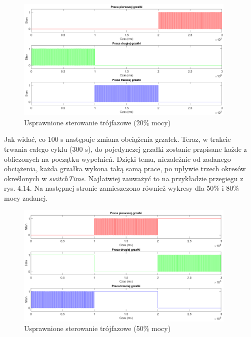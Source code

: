 \documentclass[a4paper,twoside,12pt]{book}
\begin{document}
\begin{figure}[h]
	\centering
	\includegraphics[width=0.94\textwidth]{./wykresy/png/threePhase20better.png}
	\caption{Usprawnione sterowanie trójfazowe (20\% mocy)}
	\label{fig:ThreePhase20better}
\end{figure}

\noindent Jak widać, co 100 s następuje zmiana obciążenia grzałek. Teraz, w trakcie trwania całego cyklu (300 s), do pojedynczej grzałki zostanie przpisane każde z obliczonych na początku wypełnień. Dzięki temu, niezależnie od zadanego obciążenia, każda grzałka wykona taką samą prace, po upływie trzech okresów określonych w \textit{switchTime}. Najłatwiej zauważyć to na przykładzie przegiegu z rys. 4.14. Na następnej stronie zamieszczono również wykresy dla 50\% i 80\% mocy zadanej.

\begin{figure}[h]
	\centering
	\includegraphics[width=0.94\textwidth]{./wykresy/png/threePhase50better.png}
	\caption{Usprawnione sterowanie trójfazowe (50\% mocy)}
	\label{fig:ThreePhase50better}
\end{figure}
\end{document}
